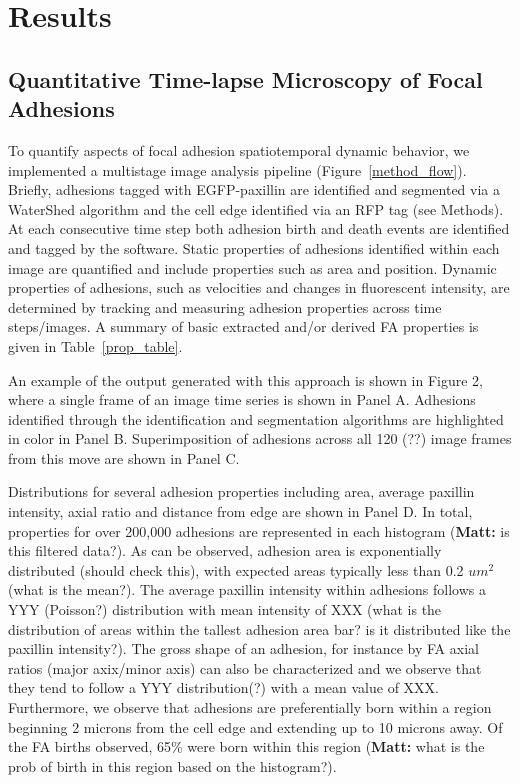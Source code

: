 \documentclass[10pt]{article}
\begin{document}
\section*{Results}


\subsection*{Quantitative Time-lapse Microscopy of Focal Adhesions}

To quantify aspects of focal adhesion spatiotemporal dynamic behavior, we implemented a multistage image analysis pipeline (Figure~\ref{method_flow}). Briefly, adhesions tagged with EGFP-paxillin are identified and segmented via a WaterShed algorithm and the cell edge identified via an RFP tag (see Methods). At each consecutive time step both adhesion birth and death events are identified and tagged by the software. Static properties of adhesions identified within each image are quantified and include properties such as area and position. Dynamic properties of adhesions, such as velocities and changes in fluorescent intensity, are determined by tracking and measuring adhesion properties across time steps/images. A summary of basic extracted and/or derived FA properties is given in Table~\ref{prop_table}.

An example of the output generated with this approach is shown in Figure 2, where a single frame of an image time series is shown in Panel A. Adhesions identified through the identification and segmentation algorithms are highlighted in color in Panel B. Superimposition of adhesions across all 120 (??) image frames from this move are shown in Panel C.    

Distributions for several adhesion properties including area, average paxillin intensity, axial ratio and distance from edge are shown in Panel D. In total, properties for over 200,000 adhesions are represented in each histogram (\textbf{Matt:} is this filtered data?). As can be observed, adhesion area is exponentially distributed (should check this), with expected areas typically less than 0.2 $um^2$ (what is the mean?). The average paxillin intensity within adhesions follows a YYY (Poisson?) distribution with mean intensity of XXX (what is the distribution of areas within the tallest adhesion area bar? is it distributed like the paxillin intensity?). The gross shape of an adhesion, for instance by FA axial ratios (major axix/minor axis) can also be characterized and we observe that they tend to follow a YYY distribution(?) with a mean value of XXX. Furthermore, we observe that adhesions are preferentially born within a region beginning 2 microns from the cell edge and extending up to 10 microns away. Of the FA births observed, 65\% were born within this region (\textbf{Matt:} what is the prob of birth in this region based on the histogram?).
\end{document}

